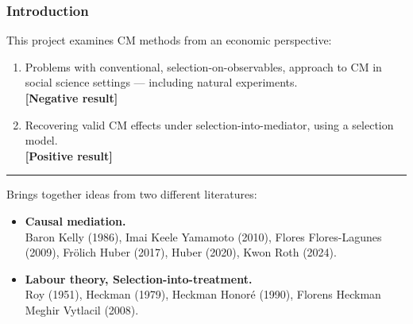 \documentclass[dvipsnames]{beamer} %
\begin{document}
\begin{frame}[noframenumbering]
    \frametitle{Introduction}
    This project examines CM methods from an economic perspective:
    \begin{enumerate}
        \item Problems with conventional, selection-on-observables, approach to CM in social science settings --- including natural experiments.
        \\ \textbf{[Negative result]}
        \item Recovering valid CM effects under selection-into-mediator, using a selection model.
        \\ \textbf{[Positive result]}
    \end{enumerate}
    \par\noindent\rule{\textwidth}{0.4pt}
    Brings together ideas from two different literatures:
    \begin{itemize}
        \item \textbf{Causal mediation.}
        \\ Baron Kelly (1986), Imai Keele Yamamoto (2010), Flores Flores-Lagunes (2009), Fr\"olich Huber (2017), Huber (2020), Kwon Roth (2024).
        \item \textbf{Labour theory, Selection-into-treatment.}
        \\ Roy (1951), Heckman (1979), Heckman Honor\'e (1990), Florens Heckman Meghir Vytlacil (2008).
    \end{itemize}
\end{frame}%
\end{document}
